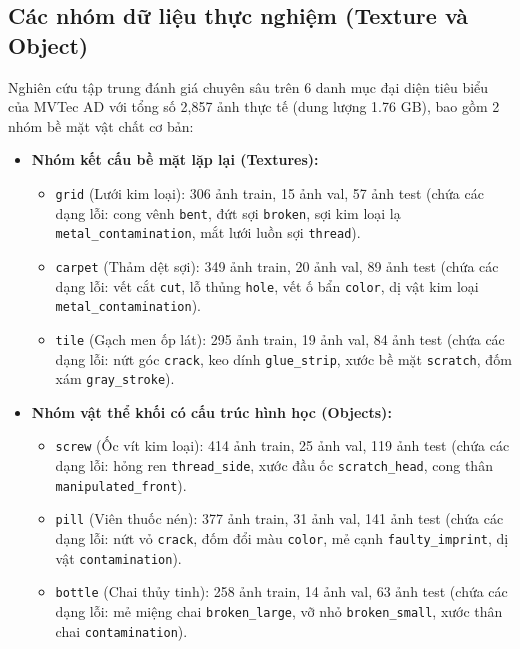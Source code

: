 \subsection{Các nhóm dữ liệu thực nghiệm (Texture và Object)}

Nghiên cứu tập trung đánh giá chuyên sâu trên 6 danh mục đại diện tiêu biểu của MVTec AD với tổng số 2,857 ảnh thực tế (dung lượng 1.76 GB), bao gồm 2 nhóm bề mặt vật chất cơ bản:
\begin{itemize}
    \item \textbf{Nhóm kết cấu bề mặt lặp lại (Textures):}
    \begin{itemize}
        \item \texttt{grid} (Lưới kim loại): 306 ảnh train, 15 ảnh val, 57 ảnh test (chứa các dạng lỗi: cong vênh \texttt{bent}, đứt sợi \texttt{broken}, sợi kim loại lạ \texttt{metal\_contamination}, mắt lưới luồn sợi \texttt{thread}).
        \item \texttt{carpet} (Thảm dệt sợi): 349 ảnh train, 20 ảnh val, 89 ảnh test (chứa các dạng lỗi: vết cắt \texttt{cut}, lỗ thủng \texttt{hole}, vết ố bẩn \texttt{color}, dị vật kim loại \texttt{metal\_contamination}).
        \item \texttt{tile} (Gạch men ốp lát): 295 ảnh train, 19 ảnh val, 84 ảnh test (chứa các dạng lỗi: nứt góc \texttt{crack}, keo dính \texttt{glue\_strip}, xước bề mặt \texttt{scratch}, đốm xám \texttt{gray\_stroke}).
    \end{itemize}
    \item \textbf{Nhóm vật thể khối có cấu trúc hình học (Objects):}
    \begin{itemize}
        \item \texttt{screw} (Ốc vít kim loại): 414 ảnh train, 25 ảnh val, 119 ảnh test (chứa các dạng lỗi: hỏng ren \texttt{thread\_side}, xước đầu ốc \texttt{scratch\_head}, cong thân \texttt{manipulated\_front}).
        \item \texttt{pill} (Viên thuốc nén): 377 ảnh train, 31 ảnh val, 141 ảnh test (chứa các dạng lỗi: nứt vỏ \texttt{crack}, đốm đổi màu \texttt{color}, mẻ cạnh \texttt{faulty\_imprint}, dị vật \texttt{contamination}).
        \item \texttt{bottle} (Chai thủy tinh): 258 ảnh train, 14 ảnh val, 63 ảnh test (chứa các dạng lỗi: mẻ miệng chai \texttt{broken\_large}, vỡ nhỏ \texttt{broken\_small}, xước thân chai \texttt{contamination}).
    \end{itemize}
\end{itemize}

